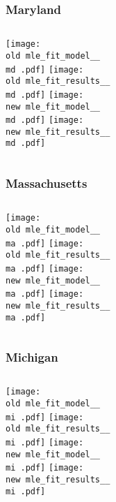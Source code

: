\documentclass{beamer}
\newcommand{\old}{current_two_stage_output/pyseir/state_summaries/reports/}
\newcommand{\new}{new_shortest_t_delta/pyseir/state_summaries/reports/}
\newcommand{\md}{Maryland__24}
\newcommand{\ma}{Massachusetts__25}
\newcommand{\mi}{Michigan__26}
\begin{document}
\begin{frame}
\frametitle{Maryland}
    \begin{columns}[t]

       \texttt{[image: \\old mle\_fit\_model\_\_\\md .pdf]}
       \texttt{[image: \\old mle\_fit\_results\_\_\\md .pdf]}   
       \texttt{[image: \\new mle\_fit\_model\_\_\\md .pdf]}
       \texttt{[image: \\new mle\_fit\_results\_\_\\md .pdf]}   
\end{columns}
\end{frame}

\begin{frame}
\frametitle{Massachusetts}
    \begin{columns}[t]

       \texttt{[image: \\old mle\_fit\_model\_\_\\ma .pdf]}
       \texttt{[image: \\old mle\_fit\_results\_\_\\ma .pdf]}   
       \texttt{[image: \\new mle\_fit\_model\_\_\\ma .pdf]}
       \texttt{[image: \\new mle\_fit\_results\_\_\\ma .pdf]}   
\end{columns}
\end{frame}

\begin{frame}
\frametitle{Michigan}
    \begin{columns}[t]

       \texttt{[image: \\old mle\_fit\_model\_\_\\mi .pdf]}
       \texttt{[image: \\old mle\_fit\_results\_\_\\mi .pdf]}   
       \texttt{[image: \\new mle\_fit\_model\_\_\\mi .pdf]}
       \texttt{[image: \\new mle\_fit\_results\_\_\\mi .pdf]}   
\end{columns}
\end{frame}
\end{document}
